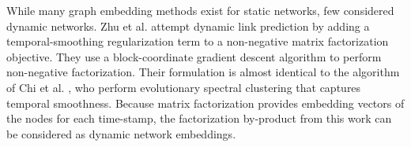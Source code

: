 

While many graph embedding methods exist for static networks, few considered dynamic networks. Zhu et al. \cite{Zhu2016} attempt dynamic link prediction by adding a temporal-smoothing regularization term to a non-negative matrix factorization objective. They use a block-coordinate gradient descent algorithm to perform non-negative factorization. Their formulation is almost identical to the algorithm of Chi et al. \cite{Chi:2007}, who perform evolutionary spectral clustering that captures temporal smoothness. Because matrix factorization provides embedding vectors of the nodes for each time-stamp, the factorization by-product from this work can be considered as dynamic network embeddings.





